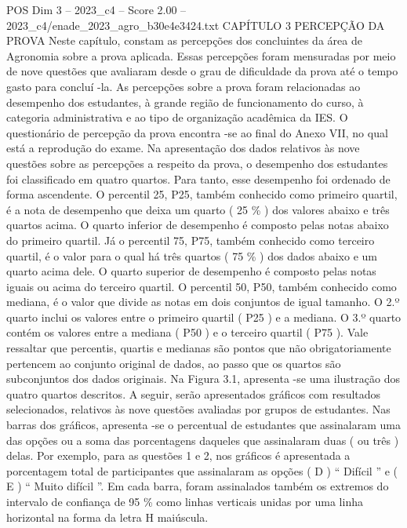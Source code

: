 \begin{textsample}{POS Dim 3 – 2023\_c4 – Score 2.00 – 2023\_c4/enade\_2023\_agro\_b30e4e3424.txt}  \label{ex:f3_pos_092}
CAPÍTULO 3 PERCEPÇÃO DA PROVA Neste capítulo, constam as percepções dos concluintes da área de Agronomia sobre a prova aplicada.
Essas percepções foram mensuradas por meio de nove questões que avaliaram desde o grau de dificuldade da prova até o tempo gasto para concluí -la.
As percepções sobre a prova foram relacionadas ao desempenho dos estudantes, à grande região de funcionamento do curso, à categoria administrativa e ao tipo de organização acadêmica da IES.
O questionário de percepção da prova encontra -se ao final do Anexo VII, no qual está a reprodução do exame.
Na apresentação dos dados relativos às nove questões sobre as percepções a respeito da prova, o desempenho dos estudantes foi classificado em quatro quartos.
Para tanto, esse desempenho foi ordenado de forma ascendente.
O percentil 25, P25, também conhecido como primeiro quartil, é a nota de desempenho que deixa um quarto ( 25 \% ) dos valores abaixo e três quartos acima.
O quarto inferior de desempenho é composto pelas notas abaixo do primeiro quartil.
Já o percentil 75, P75, também conhecido como terceiro quartil, é o valor para o qual há três quartos ( 75 \% ) dos dados abaixo e um quarto acima dele.
O quarto superior de desempenho é composto pelas notas iguais ou acima do terceiro quartil.
O percentil 50, P50, também conhecido como mediana, é o valor que divide as notas em dois conjuntos de igual tamanho.
O 2.º quarto inclui os valores entre o primeiro quartil ( P25 ) e a mediana.
O 3.º quarto contém os valores entre a mediana ( P50 ) e o terceiro quartil ( P75 ).
Vale ressaltar que percentis, quartis e medianas são pontos que não obrigatoriamente pertencem ao conjunto original de dados, ao passo que os quartos são subconjuntos dos dados originais.
Na Figura 3.1, apresenta -se uma ilustração dos quatro quartos descritos.
A seguir, serão apresentados gráficos com resultados selecionados, relativos às nove questões avaliadas por grupos de estudantes.
Nas barras dos gráficos, apresenta -se o percentual de estudantes que assinalaram uma das opções ou a soma das porcentagens daqueles que assinalaram duas ( ou três ) delas.
Por exemplo, para as questões 1 e 2, nos gráficos é apresentada a porcentagem total de participantes que assinalaram as opções ( D ) “ Difícil ” e ( E ) “ Muito difícil ”.
Em cada barra, foram assinalados também os extremos do intervalo de confiança de 95 \% como linhas verticais unidas por uma linha horizontal na forma da letra H maiúscula.

\end{textsample}
